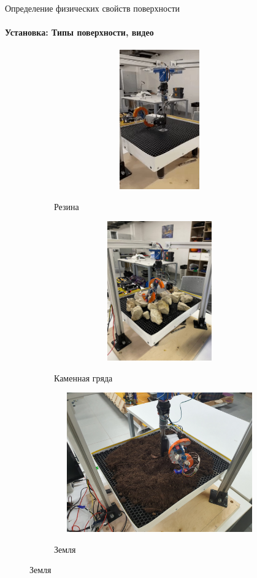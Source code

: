 \documentclass[aspectratio=169,xcolor=table]{beamer}
\begin{document}
\begin{frame}[t]{Определение физических свойств поверхности}
    \framesubtitle{Установка: Типы поверхности, видео}
    \vspace{-15pt}
    \begin{figure}[H]
        \begin{subfigure}{0.22\textwidth}
            \href{run:./videos/flat.gif}
            {\centering\includegraphics[height=6cm,width=1\textwidth,keepaspectratio]{s_shape_leg/flat.jpg}} 
            \caption*{Резина}
        \end{subfigure}
        \hfill
        \begin{subfigure}{0.26\textwidth}
            \href{run:./videos/rock.gif}
            {\centering\includegraphics[height=6cm,width=1\textwidth,keepaspectratio]{s_shape_leg/view.jpg}}
            \caption*{Каменная гряда}
        \end{subfigure}
        \begin{subfigure}{0.5\textwidth}
            {\centering\includegraphics[height=6cm,width=1\textwidth,keepaspectratio]{s_shape_leg/mould.jpg}}
            \caption*{Земля}
        \end{subfigure}
    \end{figure}
\end{frame}
\end{document}
